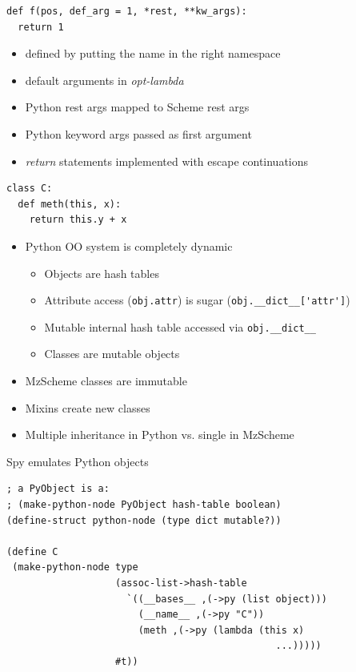 \documentclass[landscape,20pt,dvips]{foils}
\newcommand{\jhead}[1]{\foilhead{\flushleft \textcolor{vinho}{\large   #1}
\vspace{-0.84cm} \\ {\color{black} --------------------------------------------------------------- }}}
\begin{document}
\jhead{Translations: Functions}
\lstset{language=Python}
\begin{lstlisting}
def f(pos, def_arg = 1, *rest, **kw_args):
  return 1
\end{lstlisting}

  \begin{itemize}
    \item defined by putting the name in the right namespace
    \item default arguments in \emph{opt-lambda}
    \item Python rest args mapped to Scheme rest args
    \item Python keyword args passed as first argument
    \item \emph{return} statements implemented with escape continuations
  \end{itemize}
\jhead{Translations: Classes: Problems}
\begin{lstlisting}
class C:
  def meth(this, x):
    return this.y + x
\end{lstlisting}
  \begin{itemize}
    \item Python OO system is completely dynamic
      \begin{itemize}
        \item Objects are hash tables
        \item Attribute access (\verb|obj.attr|) is sugar (\verb|obj.__dict__['attr']|)
        \item Mutable internal hash table accessed via \verb|obj.__dict__|
        \item Classes are mutable objects
      \end{itemize}
    \item MzScheme classes are immutable
    \item Mixins create new classes
    \item Multiple inheritance in Python vs. single in MzScheme
  \end{itemize}
\jhead{Translations: Classes: Solution}
    Spy emulates Python objects
\\
\begin{lstlisting}
; a PyObject is a:
; (make-python-node PyObject hash-table boolean)
(define-struct python-node (type dict mutable?))

(define C
 (make-python-node type
                   (assoc-list->hash-table
                     `((__bases__ ,(->py (list object)))
                       (__name__ ,(->py "C"))
                       (meth ,(->py (lambda (this x)
                                               ...)))))
                   #t))
\end{lstlisting}
\end{document}
